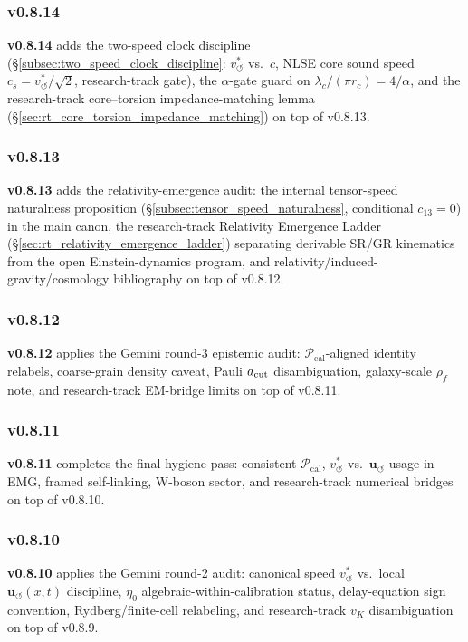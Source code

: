 \documentclass[11pt]{article}
\theoremstyle{definition}
\theoremstyle{plain}
\theoremstyle{remark}
\newcommand{\rhoF}{{\rho_{\!f}}}
\newcommand{\rc}{{r_c}}
\newcommand{\vchar}{v_{\!\boldsymbol{\circlearrowleft}}^{\ast}}
\newcommand{\uswirl}{\mathbf{u}_{\!\boldsymbol{\circlearrowleft}}}
\begin{document}
        \subsubsection{v0.8.14}
            \textbf{v0.8.14} adds the two-speed clock discipline (\S\ref{subsec:two_speed_clock_discipline}: $\vchar$ vs.\ $c$, NLSE core sound speed $c_s=\vchar/\sqrt{2}$, research-track gate), the $\alpha$-gate guard on $\lambda_c/(\pi\rc)=4/\alpha$, and the research-track core--torsion impedance-matching lemma (\S\ref{sec:rt_core_torsion_impedance_matching}) on top of v0.8.13.

        \subsubsection{v0.8.13}
            \textbf{v0.8.13} adds the relativity-emergence audit: the internal tensor-speed naturalness proposition (\S\ref{subsec:tensor_speed_naturalness}, conditional $c_{13}=0$) in the main canon, the research-track Relativity Emergence Ladder (\S\ref{sec:rt_relativity_emergence_ladder}) separating derivable SR/GR kinematics from the open Einstein-dynamics program, and relativity/induced-gravity/cosmology bibliography on top of v0.8.12.

        \subsubsection{v0.8.12}
            \textbf{v0.8.12} applies the Gemini round-3 epistemic audit: $\mathcal{P}_{\mathrm{cal}}$-aligned identity relabels, coarse-grain density caveat, Pauli $a_{\rm cut}$ disambiguation, galaxy-scale $\rhoF$ note, and research-track EM-bridge limits on top of v0.8.11.

        \subsubsection{v0.8.11}
            \textbf{v0.8.11} completes the final hygiene pass: consistent $\mathcal{P}_{\mathrm{cal}}$, $\vchar$ vs.\ $\uswirl$ usage in EMG, framed self-linking, W-boson sector, and research-track numerical bridges on top of v0.8.10.

        \subsubsection{v0.8.10}
            \textbf{v0.8.10} applies the Gemini round-2 audit: canonical speed $\vchar$ vs.\ local $\uswirl(x,t)$ discipline, $\eta_0$ algebraic-within-calibration status, delay-equation sign convention, Rydberg/finite-cell relabeling, and research-track $v_K$ disambiguation on top of v0.8.9.
\end{document}
